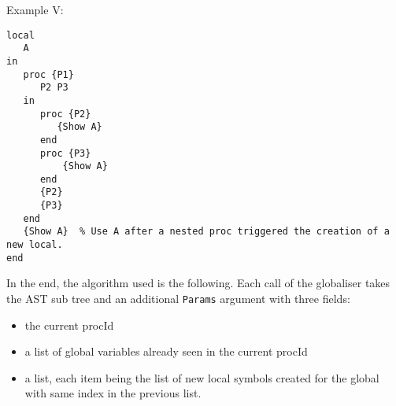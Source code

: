 \documentclass[a4paper]{memoir}
\begin{document}
Example V:
\begin{lstlisting}
local
   A
in
   proc {P1}
      P2 P3
   in
      proc {P2}
         {Show A}
      end
      proc {P3}
          {Show A}
      end
      {P2}
      {P3}
   end
   {Show A}  % Use A after a nested proc triggered the creation of a new local.
end
\end{lstlisting}

In the end, the algorithm used is the following.
Each call of the globaliser takes the AST sub tree and an additional \lstinline!Params! argument with three fields:
\begin{itemize}
   \item the current procId
   \item a list of global variables already seen in the current procId
   \item a list, each item being the list of new local symbols created for the global with same index in the previous list.
\end{itemize}
\end{document}
